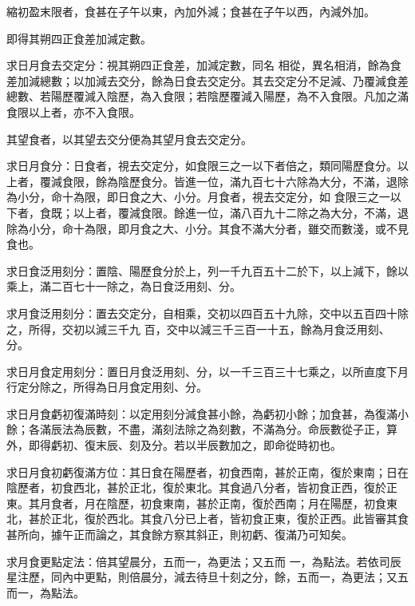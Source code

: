 \begin{pinyinscope}
 縮初盈末限者，食甚在子午以東，內加外減；食甚在子午以西，內減外加。



 即得其朔四正食差加減定數。



 求日月食去交定分：視其朔四正食差，加減定數，同名
 相從，異名相消，餘為食差加減總數；以加減去交分，餘為日食去交定分。其去交定分不足減、乃覆減食差總數、若陽歷覆減入陰歷，為入食限；若陰歷覆減入陽歷，為不入食限。凡加之滿食限以上者，亦不入食限。



 其望食者，以其望去交分便為其望月食去交定分。



 求日月食分：日食者，視去交定分，如食限三之一以下者倍之，類同陽歷食分。以上者，覆減食限，餘為陰歷食分。皆進一位，滿九百七十六除為大分，不滿，退除為小分，命十為限，即日食之大、小分。月食者，視去交定分，如
 食限三之一以下者，食既；以上者，覆減食限。餘進一位，滿八百九十二除之為大分，不滿，退除為小分，命十為限，即月食之大、小分。其食不滿大分者，雖交而數淺，或不見食也。



 求日食泛用刻分：置陰、陽歷食分於上，列一千九百五十二於下，以上減下，餘以乘上，滿二百七十一除之，為日食泛用刻、分。



 求月食泛用刻分：置去交定分，自相乘，交初以四百五十九除，交中以五百四十除之，所得，交初以減三千九
 百，交中以減三千三百一十五，餘為月食泛用刻、分。



 求日月食定用刻分：置日月食泛用刻、分，以一千三百三十七乘之，以所直度下月行定分除之，所得為日月食定用刻、分。



 求日月食虧初復滿時刻：以定用刻分減食甚小餘，為虧初小餘；加食甚，為復滿小餘；各滿辰法為辰數，不盡，滿刻法除之為刻數，不滿為分。命辰數從子正，算外，即得虧初、復末辰、刻及分。若以半辰數加之，即命從時初也。



 求日月食初虧復滿方位：其日食在陽歷者，初食西南，甚於正南，復於東南；日在陰歷者，初食西北，甚於正北，復於東北。其食過八分者，皆初食正西，復於正東。其月食者，月在陰歷，初食東南，甚於正南，復於西南；月在陽歷，初食東北，甚於正北，復於西北。其食八分已上者，皆初食正東，復於正西。此皆審其食甚所向，據午正而論之，其食餘方察其斜正，則初虧、復滿乃可知矣。



 求月食更點定法：倍其望晨分，五而一，為更法；又五而
 一，為點法。若依司辰星注歷，同內中更點，則倍晨分，減去待旦十刻之分，餘，五而一，為更法；又五而一，為點法。




\end{pinyinscope}
